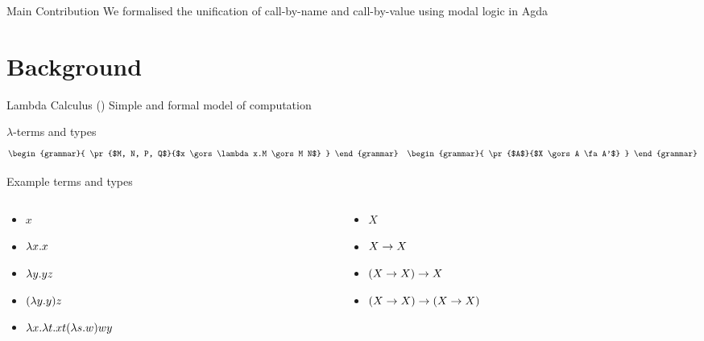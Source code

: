 \documentclass{beamer}
\theoremstyle{definition}
\begin{document}
  \begin{frame}{Main Contribution}
    \Large
    We formalised the unification of call-by-name and call-by-value using modal logic in Agda
  \end{frame}

  \section{Background}
  \begin{frame}{Lambda Calculus (\lc)}
    Simple and formal \alert{model of computation}
    \begin{block}{\boldmath${\lambda}$-terms and types}
      \begin{align*}
        \begin{grammar}{
          \pr{$M, N, P, Q$}{$x \gors \lambda x.M \gors M N$}
        }
        \end{grammar}
        \quad 
        \begin{grammar}{
          \pr{$A$}{$X \gors A \fa A'$}
        }
        \end{grammar}
      \end{align*}
    \end{block} \pause
    \begin{block}{Example \alert{terms} and \alert{types}} \pause
      \begin{columns}
        \begin{column}{0.48\textwidth}
          \begin{itemize}
            \item $x$ \pause
            \item $\lambda {x}.{x}$ \pause
            \item $\lambda {y}.{y} z$ \pause
            \item $(\lambda {y}.{y}) z$ \pause
            \item $\lambda {x}.{\lambda {t}.{x t (\lambda {s}.{w})}wy}$ \pause
          \end{itemize}
        \end{column}
        \begin{column}{0.48\textwidth}
          \begin{itemize}
            \item $X$ \pause
            \item $X \to X$\pause
            \item $(X \to X) \to X$\pause
            \item $(X \to X) \to (X \to X)$
          \end{itemize}
        \end{column}
      \end{columns}
    \end{block}
  \end{frame}
\end{document}
